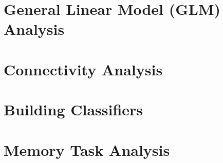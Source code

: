 \section{General Linear Model (GLM) Analysis}
\section{Connectivity Analysis}
\section{Building Classifiers}
\section{Memory Task Analysis}